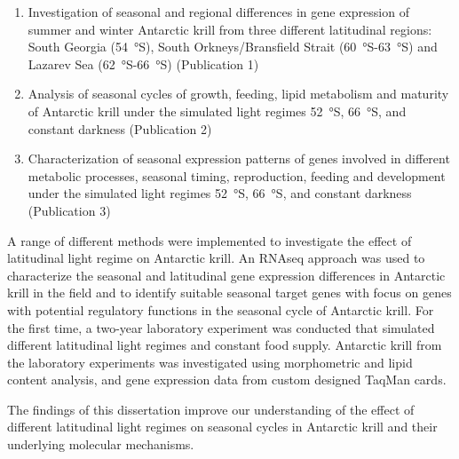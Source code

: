 \begin{enumerate}
\item Investigation of seasonal and regional differences in gene expression of
        summer and winter Antarctic krill from three different latitudinal
                regions: South Georgia (\SI{54}{\degree}S), South
                Orkneys/Bransfield Strait (\SI{60}{\degree}S-\SI{63}{\degree}S)
                and Lazarev Sea (\SI{62}{\degree}S-\SI{66}{\degree}S)
                (Publication 1)
\item Analysis of seasonal cycles of growth, feeding, lipid metabolism and
        maturity of Antarctic krill under the simulated light regimes
                \SI{52}{\degree}S, \SI{66}{\degree}S, and constant darkness
                (Publication 2)
\item Characterization of seasonal expression patterns of genes involved in
        different metabolic processes, seasonal timing, reproduction, feeding
                and development under the simulated light regimes
                \SI{52}{\degree}S, \SI{66}{\degree}S, and constant darkness
                (Publication 3)
\end{enumerate}

A range of different methods were implemented to investigate the effect of
latitudinal light regime on Antarctic krill. An RNAseq approach was used to
characterize the seasonal and latitudinal gene expression differences in
Antarctic krill in the field and to identify suitable seasonal target genes
with focus on genes with potential regulatory functions in the seasonal cycle
of Antarctic krill. For the first time, a two-year laboratory experiment was
conducted that simulated different latitudinal light regimes and constant food
supply. Antarctic krill from the laboratory experiments was investigated using
morphometric and lipid content analysis, and gene expression data from custom
designed TaqMan cards.

The findings of this dissertation improve our understanding of the effect of
different latitudinal light regimes on seasonal cycles in Antarctic krill and
their underlying molecular mechanisms.

\printbibliography[heading=subbibliography]
